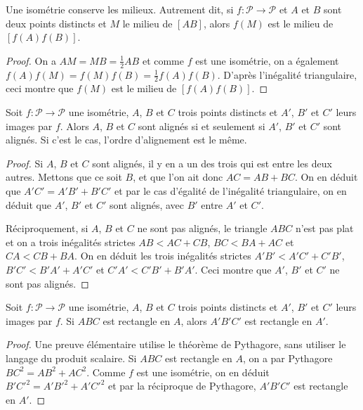 \begin{proposition}
Une isométrie conserve les milieux. Autrement dit, si $f : \mathcal P\to \mathcal P$ et $A$ et $B$ sont deux points distincts et $M$ le milieu de $[AB]$, alors $f(M)$ est le milieu de $[f(A)f(B)]$.
\end{proposition}
\begin{proof}
On a $AM=MB=\frac12AB$ et comme $f$ est une isométrie, on a également $f(A)f(M)=f(M)f(B)=\frac12f(A)f(B)$. D'après l'inégalité triangulaire, ceci montre que $f(M)$ est le milieu de $[f(A)f(B)]$.
\end{proof}

\begin{proposition}
Soit $f : \mathcal P\to \mathcal P$ une isométrie, $A$, $B$ et $C$ trois points distincts et $A'$, $B'$ et $C'$ leurs images par $f$. Alors $A$, $B$ et $C$ sont alignés si et seulement si $A'$, $B'$ et $C'$ sont alignés. Si c'est le cas, l'ordre d'alignement est le même.
\end{proposition}
\begin{proof}
Si $A$, $B$ et $C$ sont alignés, il y en a un des trois qui est entre les deux autres. Mettons que ce soit $B$, et que l'on ait donc  $AC=AB+BC$. On en déduit que $A'C'=A'B'+B'C'$ et par le cas d'égalité de l'inégalité triangulaire, on en déduit que $A'$, $B'$ et $C'$ sont alignés, avec $B'$ entre $A'$ et $C'$.

Réciproquement, si $A$, $B$ et $C$ ne sont pas alignés, le triangle $ABC$ n'est pas plat et on a trois  inégalités strictes $AB<AC+CB$, $BC<BA+AC$ et $CA<CB+BA$. On en déduit les trois inégalités strictes $A'B'<A'C'+C'B'$, $B'C'<B'A'+A'C'$ et $C'A'<C'B'+B'A'$. Ceci montre que $A'$, $B'$ et $C'$ ne sont pas alignés. 
\end{proof}

\begin{proposition}
Soit $f : \mathcal P\to \mathcal P$ une isométrie, $A$, $B$ et $C$ trois points distincts et $A'$, $B'$ et $C'$ leurs images par $f$. Si $ABC$ est rectangle en $A$, alors $A'B'C'$ est rectangle en $A'$.
\end{proposition}
\begin{proof}
Une preuve élémentaire utilise le théorème de Pythagore, sans utiliser le langage du produit scalaire. Si $ABC$ est rectangle en $A$, on a par Pythagore $BC^2=AB^2+AC^2$. Comme $f$ est une isométrie, on en déduit $B'C'^2=A'B'^2+A'C'^2$ et par la réciproque de Pythagore, $A'B'C'$ est rectangle en $A'$.
\end{proof}

